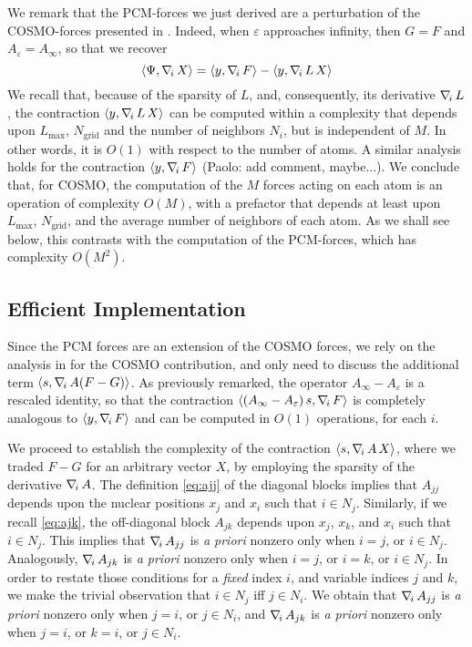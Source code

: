 We remark that the PCM-forces we just derived are a perturbation of the COSMO-forces presented in \cite{Lipparini_JCTC_ddCOSMO}. Indeed, when $\varepsilon$ approaches infinity, then $G = F$ and $A_\varepsilon = {A_\infty} $, so that we recover
\[
\langle \Psi , \nabla_{\!i}\, X\rangle =  \langle y , \nabla_{\!i}\, F \rangle - \langle y , \nabla_{\!i}\, L \,  X \rangle
\]
We recall that, because of the sparsity of $L$, and, consequently, its derivative $\nabla_{\!i}\, L$, the contraction $\langle y ,\nabla_{\!i}\, L \, X\rangle$ can be computed within a complexity that depends upon $L_\text{max}$, $N_\text{grid}$ and the number of neighbors $N_i$, but is independent of $M$. In other words, it is $O(1)$ with respect to the number of atoms. A similar analysis holds for the contraction $\langle y , \nabla_{\!i}\, F \rangle$ {\color{red} (Paolo: add comment, maybe...)}. We conclude that, for COSMO, the computation of the $M$ forces acting on each atom is an operation of complexity $O(M)$, with a prefactor that depends at least upon $L_\text{max}$, $N_\text{grid}$, and the average number of neighbors of each atom. As we shall see below, this contrasts with the computation of the PCM-forces, which has complexity $O(M^2)$.

\subsection{Efficient Implementation}

Since the PCM forces are an extension of the COSMO forces, we rely on the analysis in \cite{Lipparini_JCTC_ddCOSMO} for the COSMO contribution, and only need to discuss the additional term $\langle s , \nabla_{\!i}\,  A ( F - G ) \rangle$. As previously remarked, the operator ${A_\infty} -{A_\varepsilon}$ is a rescaled identity, so that the contraction $\langle ({A_\infty}-{A_\varepsilon})\, s, \nabla_{\!i}\, F \rangle$ is completely analogous to $\langle y , \nabla_{\!i}\, F \rangle$ and can be computed in $O(1)$ operations, for each $i$.
 
 
We proceed to establish the complexity of the contraction $\langle s , \nabla_{\!i}\,  A\, X \rangle$, where we traded $F-G$ for an arbitrary vector $X$, by employing the sparsity of the derivative $\nabla_{\!i}\, A$. The definition \eqref{eq:ajj} of the diagonal blocks implies that $A_{jj}$ depends upon the nuclear positions $x_j$ and $x_i$ such that $i \in N_j$. Similarly, if we recall \eqref{eq:ajk}, the off-diagonal block $A_{jk}$ depends upon $x_j$, $x_k$, and $x_i$ such that $i \in N_j$. This implies that $\nabla_{\!i}\, A_{jj}$ is \emph{a priori} nonzero only when $i = j$, or $i \in N_j$. Analogously, $\nabla_{\!i}\, A_{jk}$ is \emph{a priori} nonzero only when $i = j$, or $i = k$, or $i \in N_j$. In order to restate those conditions for a \emph{fixed} index $i$, and variable indices $j$ and $k$, we make the trivial observation that $i \in N_j$ iff $j \in N_i$. We obtain that $\nabla_{\!i}\, A_{jj}$ is \emph{a priori} nonzero only when $j = i$, or $j \in N_i$, and $\nabla_{\!i}\, A_{jk}$ is \emph{a priori} nonzero only when $j= i$, or $k = i$, or $j \in N_i$.

